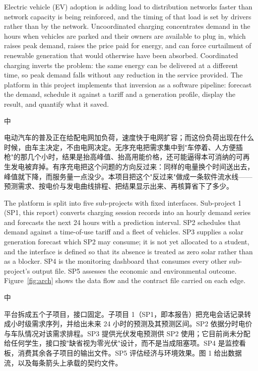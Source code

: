 \documentclass[10pt,a4paper]{article}
\newenvironment{zh}{%
  \par\vspace{1pt}%
  \begingroup
  \color{black!72}\small
  \setlength{\parskip}{0pt}%
  \noindent\textsf{\footnotesize 中}\hspace{3pt}\ignorespaces
}{%
  \par\endgroup\vspace{4pt}%
}
\begin{document}
Electric vehicle (EV) adoption is adding load to distribution networks faster than network capacity
is being reinforced, and the timing of that load is set by drivers rather than by the network.
Uncoordinated charging concentrates demand in the hours when vehicles are parked and their owners
are available to plug in, which raises peak demand, raises the price paid for energy, and can force
curtailment of renewable generation that would otherwise have been absorbed. Coordinated charging
inverts the problem: the same energy can be delivered at a different time, so peak demand falls
without any reduction in the service provided. The platform in this project implements that
inversion as a software pipeline: forecast the demand, schedule it against a tariff and a
generation profile, display the result, and quantify what it saved.

\begin{zh}
电动汽车的普及正在给配电网加负荷，速度快于电网扩容；而这份负荷出现在什么时候，由车主决定，不由电网决定。无序充电把需求集中到"车停着、人方便插枪"的那几个小时，结果是抬高峰值、抬高用能价格，还可能逼得本可消纳的可再生发电被弃掉。有序充电把这个问题的方向反过来：同样的电量换个时间送出去，峰值就下降，而服务量一点没少。本项目把这个"反过来"做成一条软件流水线——预测需求、按电价与发电曲线排程、把结果显示出来、再核算省下了多少。
\end{zh}

The platform is split into five sub-projects with fixed interfaces. Sub-project 1 (SP1, this
report) converts charging session records into an hourly demand series and forecasts the next 24
hours with a prediction interval. SP2 schedules that demand against a time-of-use tariff and a
fleet of vehicles. SP3 supplies a solar generation forecast which SP2 may consume; it is not yet
allocated to a student, and the interface is defined so that its absence is treated as zero solar
rather than as a blocker. SP4 is the monitoring dashboard that consumes every other sub-project's
output file. SP5 assesses the economic and environmental outcome. Figure~\ref{fig:arch} shows the
data flow and the contract file carried on each edge.

\begin{zh}
平台拆成五个子项目，接口固定。子项目 1（SP1，即本报告）把充电会话记录转成小时级需求序列，并给出未来 24 小时的预测及其预测区间。SP2 依据分时电价与车队情况对该需求排程。SP3 提供光伏发电预测供 SP2 使用；它目前尚未分配给任何学生，接口按"缺省视为零光伏"设计，而不是当成阻塞项。SP4 是监控看板，消费其余各子项目的输出文件。SP5 评估经济与环境效果。图 1 给出数据流，以及每条箭头上承载的契约文件。
\end{zh}
\end{document}
